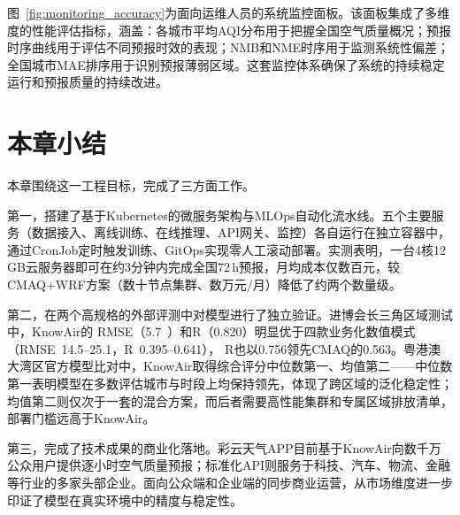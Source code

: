 图~\ref{fig:monitoring_accuracy}为面向运维人员的系统监控面板。该面板集成了多维度的性能评估指标，涵盖：各城市平均AQI分布用于把握全国空气质量概况；\PM 预报时序曲线用于评估不同预报时效的表现；NMB和NME时序用于监测系统性偏差；全国城市MAE排序用于识别预报薄弱区域。这套监控体系确保了系统的持续稳定运行和预报质量的持续改进。


\section{本章小结}
\label{sec:deploy_summary}

本章围绕这一工程目标，完成了三方面工作。

第一，搭建了基于Kubernetes的微服务架构与MLOps自动化流水线。五个主要服务（数据接入、离线训练、在线推理、API网关、监控）各自运行在独立容器中，通过CronJob定时触发训练、GitOps实现零人工滚动部署。实测表明，一台4核12\,GB云服务器即可在约3分钟内完成全国72\,h预报，月均成本仅数百元，较CMAQ{+}WRF方案（数十节点集群、数万元/月）降低了约两个数量级。

第二，在两个高规格的外部评测中对模型进行了独立验证。进博会长三角区域测试中，KnowAir的\PM{} RMSE（5.7~\ug{}）和R（0.820）明显优于四款业务化数值模式（RMSE~14.5--25.1，R~0.395--0.641），\ozone{} R也以0.756领先CMAQ的0.563。粤港澳大湾区官方模型比对中，KnowAir取得综合评分中位数第一、均值第二——中位数第一表明模型在多数评估城市与时段上均保持领先，体现了跨区域的泛化稳定性；均值第二则仅次于一套的混合方案，而后者需要高性能集群和专属区域排放清单，部署门槛远高于KnowAir。

第三，完成了技术成果的商业化落地。彩云天气APP目前基于KnowAir向数千万公众用户提供逐小时空气质量预报；标准化API则服务于科技、汽车、物流、金融等行业的多家头部企业。面向公众端和企业端的同步商业运营，从市场维度进一步印证了模型在真实环境中的精度与稳定性。